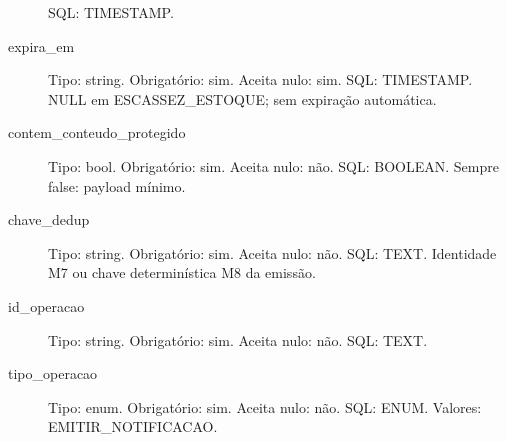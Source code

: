 \begin{description}
SQL: TIMESTAMP.
\item[expira\_em] Tipo: string. Obrigatório: sim. Aceita nulo: sim.
SQL: TIMESTAMP.
NULL em ESCASSEZ\_ESTOQUE; sem expiração automática.
\item[contem\_conteudo\_protegido] Tipo: bool. Obrigatório: sim. Aceita nulo: não.
SQL: BOOLEAN.
Sempre false: payload mínimo.
\item[chave\_dedup] Tipo: string. Obrigatório: sim. Aceita nulo: não.
SQL: TEXT.
Identidade M7 ou chave determinística M8 da emissão.
\item[id\_operacao] Tipo: string. Obrigatório: sim. Aceita nulo: não.
SQL: TEXT.
\item[tipo\_operacao] Tipo: enum. Obrigatório: sim. Aceita nulo: não.
SQL: ENUM.
Valores: EMITIR\_NOTIFICACAO.
\end{description}
